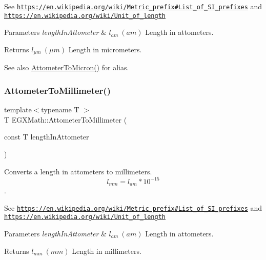 See \href{https://en.wikipedia.org/wiki/Metric_prefix#List_of_SI_prefixes}{\tt https\+://en.\+wikipedia.\+org/wiki/\+Metric\+\_\+prefix\#\+List\+\_\+of\+\_\+\+S\+I\+\_\+prefixes} and \href{https://en.wikipedia.org/wiki/Unit_of_length}{\tt https\+://en.\+wikipedia.\+org/wiki/\+Unit\+\_\+of\+\_\+length} 
\begin{DoxyParams}{Parameters}
{\em length\+In\+Attometer} & $ l_{am}\ (am)$ Length in attometers. \\
\hline
\end{DoxyParams}
\begin{DoxyReturn}{Returns}
$ l_{\mu m}\ (\mu m)$ Length in micrometers. 
\end{DoxyReturn}
\begin{DoxySeeAlso}{See also}
\mbox{\hyperlink{group___e_g_x_math-_conversions-_length_conversions-_s_i-_attometer-_non-_s_i_ga9aaf945221fbc8d469121e0fd0980b41}{Attometer\+To\+Micron()}} for alias. 
\end{DoxySeeAlso}
\mbox{\label{group___e_g_x_math-_conversions-_length_conversions-_s_i-_attometer-_s_i_gaa1844671e09a5d485145eb7cc152ba19}} 
\subsubsection{\texorpdfstring{Attometer\+To\+Millimeter()}{AttometerToMillimeter()}}
{\footnotesize\ttfamily template$<$typename T $>$ \\
T E\+G\+X\+Math\+::\+Attometer\+To\+Millimeter (\begin{DoxyParamCaption}\item[{const T}]{length\+In\+Attometer }\end{DoxyParamCaption})}



Converts a length in attometers to millimeters. \[ l_{mm}=l_{am} * 10^{-15} \]. 

See \href{https://en.wikipedia.org/wiki/Metric_prefix#List_of_SI_prefixes}{\tt https\+://en.\+wikipedia.\+org/wiki/\+Metric\+\_\+prefix\#\+List\+\_\+of\+\_\+\+S\+I\+\_\+prefixes} and \href{https://en.wikipedia.org/wiki/Unit_of_length}{\tt https\+://en.\+wikipedia.\+org/wiki/\+Unit\+\_\+of\+\_\+length} 
\begin{DoxyParams}{Parameters}
{\em length\+In\+Attometer} & $ l_{am}\ (am)$ Length in attometers. \\
\hline
\end{DoxyParams}
\begin{DoxyReturn}{Returns}
$ l_{mm}\ (mm)$ Length in millimeters. 
\end{DoxyReturn}
\mbox{\label{group___e_g_x_math-_conversions-_length_conversions-_s_i-_attometer-_s_i_gacb010bf3c4fb120c4a43cf16c7d9c77f}} 
